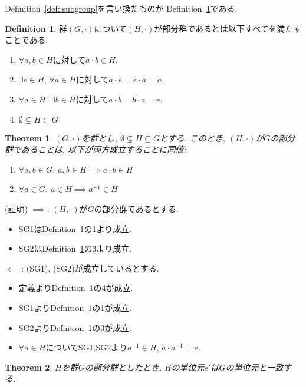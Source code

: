 \documentclass{article}
\theoremstyle{plain}
\newtheorem{theorem}{Theorem}
\theoremstyle{definition}
\newtheorem{definition}{Definition}
\theoremstyle{plain}
\numberwithin{equation}{section}
\numberwithin{theorem}{section}
\numberwithin{definition}{section}
\numberwithin{note}{section}
\begin{document}
\par Definition~\ref{def::subgroup}を言い換たものが Definition~\ref{def::subgroup1}である.
\begin{definition}\label{def::subgroup1}
     群$(G,\cdot)$について$(H,\cdot )$が部分群であるとは以下すべてを満たすことである.
     \begin{enumerate}
          \item $\forall a,b\in H$に対して$a\cdot b\in H$.
          \item $\exists e \in H$, $\forall a \in H$に対して$a\cdot e=e\cdot a=a$.
          \item $\forall a \in H$, $\exists b\in H$に対して$a\cdot b=b\cdot a=e$.
          \item $\emptyset\subsetneq H\subset G$
     \end{enumerate}
\end{definition}
\begin{theorem}\label{thm::subgroup}
     $(G, \cdot)$を群とし, $\emptyset\subsetneq H\subseteq G$とする. このとき, $(H, \cdot)$が$G$の部分群であることは, 以下が両方成立することに同値:
     \begin{enumerate}
          \item[SG1.]  $\forall a, b\in G$. $a, b\in H\implies a\cdot b\in H$
          \item[SG2.]  $\forall a\in G$. $a\in H \implies a^{-1}\in H$
     \end{enumerate}
\end{theorem}
(証明)
$\implies$: $(H, \cdot)$が$G$の部分群であるとする.\\
\begin{itemize}
     \item SG1はDefnition~\ref{def::subgroup1}の1より成立.
     \item SG2はDefnition~\ref{def::subgroup1}の3より成立.
\end{itemize}
$\impliedby$: (SG1), (SG2)が成立しているとする.
\begin{itemize}
     \item 定義よりDefnition~\ref{def::subgroup1}の4が成立.
     \item  SG1よりDefnition~\ref{def::subgroup1}の1が成立.
     \item SG2よりDefnition~\ref{def::subgroup1}の3が成立.
     \item $\forall a\in H$についてSG1,SG2より$a^{-1}\in H$, $a\cdot a^{-1}=e$.
\end{itemize}
\begin{theorem}
     $H$を群$G$の部分群としたとき, $H$の単位元$e'$は$G$の単位元と一致する.
\end{theorem}
\end{document}
